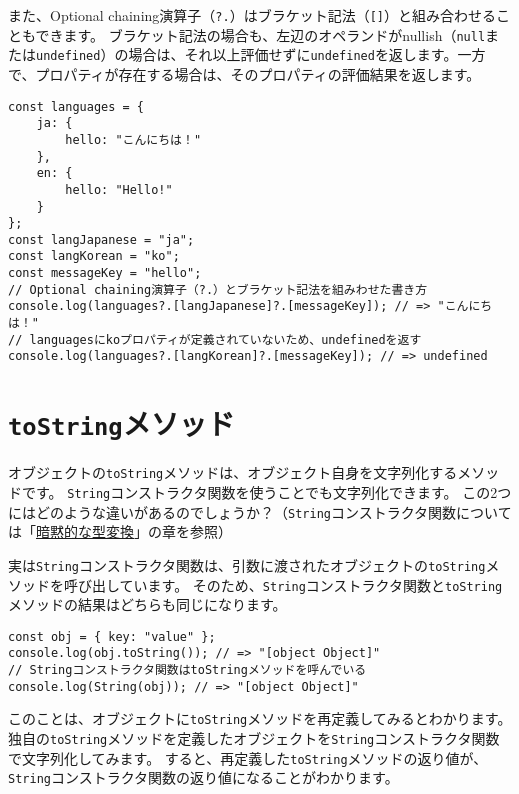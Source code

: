また、Optional chaining演算子（\texttt{?.}）はブラケット記法（\texttt{[]}）と組み合わせることもできます。
ブラケット記法の場合も、左辺のオペランドがnullish（\texttt{null}または\texttt{undefined}）の場合は、それ以上評価せずに\texttt{undefined}を返します。一方で、プロパティが存在する場合は、そのプロパティの評価結果を返します。

\begin{lstlisting}
const languages = {
    ja: {
        hello: "こんにちは！"
    },
    en: {
        hello: "Hello!"
    }
};
const langJapanese = "ja";
const langKorean = "ko";
const messageKey = "hello";
// Optional chaining演算子（?.）とブラケット記法を組みわせた書き方
console.log(languages?.[langJapanese]?.[messageKey]); // => "こんにちは！"
// languagesにkoプロパティが定義されていないため、undefinedを返す
console.log(languages?.[langKorean]?.[messageKey]); // => undefined
\end{lstlisting}

\hypertarget{toString-method}{%
\section{\texorpdfstring{\texttt{toString}メソッド}{toStringメソッド}}\label{toString-method}}

オブジェクトの\texttt{toString}メソッドは、オブジェクト自身を文字列化するメソッドです。
\texttt{String}コンストラクタ関数を使うことでも文字列化できます。
この2つにはどのような違いがあるのでしょうか？（\texttt{String}コンストラクタ関数については「\hyperlink{implicit-coercion}{暗黙的な型変換}」の章を参照）

実は\texttt{String}コンストラクタ関数は、引数に渡されたオブジェクトの\texttt{toString}メソッドを呼び出しています。\enlargethispage{\baselineskip}
そのため、\texttt{String}コンストラクタ関数と\texttt{toString}メソッドの結果はどちらも同じになります。

\begin{lstlisting}
const obj = { key: "value" };
console.log(obj.toString()); // => "[object Object]"
// Stringコンストラクタ関数はtoStringメソッドを呼んでいる
console.log(String(obj)); // => "[object Object]"
\end{lstlisting}

このことは、オブジェクトに\texttt{toString}メソッドを再定義してみるとわかります。
独自の\texttt{toString}メソッドを定義したオブジェクトを\texttt{String}コンストラクタ関数で文字列化してみます。
すると、再定義した\texttt{toString}メソッドの返り値が、\texttt{String}コンストラクタ関数の返り値になることがわかります。

